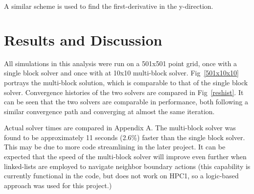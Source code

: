 \documentclass[twocolumn,10pt]{asme2ej}
\begin{document}
\noindent A similar scheme is used to find the first-derivative in the y-direction.




\section{Results and Discussion}

All simulations in this analysis were run on a 501x501 point grid, once with a single block solver and once with at 10x10 multi-block solver.  Fig~\ref{501x10x10} portrays the multi-block solution, which is comparable to that of the single block solver.  Convergence histories of the two solvers are compared in Fig~\ref{reshist}.  It can be seen that the two solvers are comparable in performance, both following a similar convergence path and converging at almost the same iteration.

Actual solver times are compared in Appendix A.  The multi-block solver was found to be approximately 11 seconds (2.6\%) faster than the single block solver.  This may be due to more code streamlining in the later project.  It can be expected that the speed of the multi-block solver will improve even further when linked-lists are employed to navigate neighbor boundary actions (this capability is currently functional in the code, but does not work on HPC1, so a logic-based approach was used for this project.)
\end{document}
